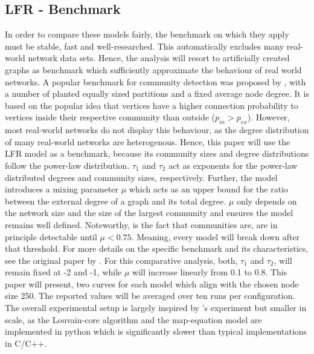 \documentclass[11pt, twocolumn]{article}
\begin{document}
\subsection{LFR - Benchmark}
In order to compare these models fairly, the benchmark on which they apply must be stable, fast and well-researched. This automatically excludes many real-world network data sets. Hence, the analysis will resort to artificially created graphs as benchmark which sufficiently approximate the behaviour of real world networks. A popular benchmark for community detection was proposed by \citeauthor{girvan_CommunityStructureSocial_2002}, with a number of planted equally sized partitions and a fixed average node degree. It is based on the popular idea that vertices have a higher connection probability to vertices inside their respective community than outside ($p_{in} > p_{ex}$). However, most real-world networks do not display this behaviour, as the degree distribution of many real-world networks are heterogenous.\cite{lancichinetti_CommunityDetectionAlgorithms_2009} Hence, this paper will use the LFR model as a benchmark, because its community sizes and degree distributions follow the power-law distribution. $\tau_1$ and $\tau_2$ act as exponents for the power-law distributed degrees and community sizes, respectively. Further, the model introduces a mixing parameter $\mu$ which acts as an upper bound for the ratio between the external degree of a graph and its total degree. $\mu$ only depends on the network size and the size of the largest community and ensures the model remains well defined. Noteworthy, is the fact that communities are, are in principle detectable until $\mu<0.75$. Meaning, every model will break down after that threshold. For more details on the specific benchmark and its characteristics, see the original paper by \citeauthor{lancichinetti_CommunityDetectionAlgorithms_2009}. For this comparative analysis, both, $\tau_1$ and $\tau_2$, will remain fixed at -2 and -1, while $\mu$ will increase linearly from 0.1 to 0.8. This paper will present, two curves for each model which align with the chosen node size 250. The reported values will be averaged over ten runs per configuration. The overall experimental setup is largely inspired by \citeauthor{lancichinetti_CommunityDetectionAlgorithms_2009}'s experiment but smaller in scale, as the Louvain-core algorithm and the map-equation model are implemented in python which is significantly slower than typical implementations in C/C++.      
\end{document}
